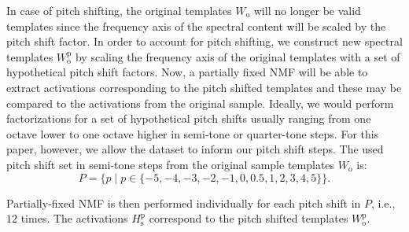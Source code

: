 \documentclass{article}
\begin{document}

In case of pitch shifting, the original templates $W_{\mathrm{o}}$ will no longer be valid templates since the frequency axis of the spectral content will be scaled by the pitch shift factor. In order to account for pitch shifting, we construct new spectral templates $W_{\mathrm{o}}^{\mathrm{p}}$ by scaling the frequency axis of the original templates with a set of hypothetical pitch shift factors. Now, a partially fixed NMF will be able to extract activations corresponding to the pitch shifted templates and these may be compared to the activations from the original sample. Ideally, we would perform factorizations for a set of hypothetical pitch shifts usually ranging from one octave lower to one octave higher in semi-tone or quarter-tone steps. For this paper, however, we allow the dataset to inform our pitch shift steps. The used pitch shift set in semi-tone steps from the original sample templates $W_\mathrm{o}$ is: 
\[ P = \{p \mid p \in \{-5,-4,-3,-2,-1,0,0.5,1,2,3,4,5\}\}.\]

Partially-fixed NMF is then performed individually for each pitch shift in $P$, i.e., $12$ times. The activations $H_{\mathrm{s}}^{\mathrm{p}}$ correspond to the pitch shifted templates $W_{\mathrm{o}}^{\mathrm{p}}$.
\end{document}
